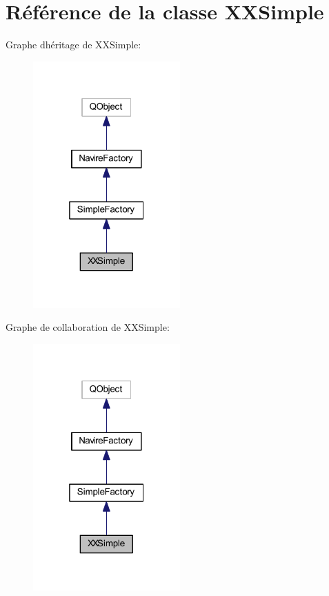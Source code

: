 \hypertarget{class_x_x_simple}{}\section{Référence de la classe X\+X\+Simple}
\label{class_x_x_simple}


Graphe d\textquotesingle{}héritage de X\+X\+Simple\+:
\nopagebreak
\begin{figure}[H]
\begin{center}
\leavevmode
\includegraphics[width=160pt]{class_x_x_simple__inherit__graph}
\end{center}
\end{figure}


Graphe de collaboration de X\+X\+Simple\+:
\nopagebreak
\begin{figure}[H]
\begin{center}
\leavevmode
\includegraphics[width=160pt]{class_x_x_simple__coll__graph}
\end{center}
\end{figure}
